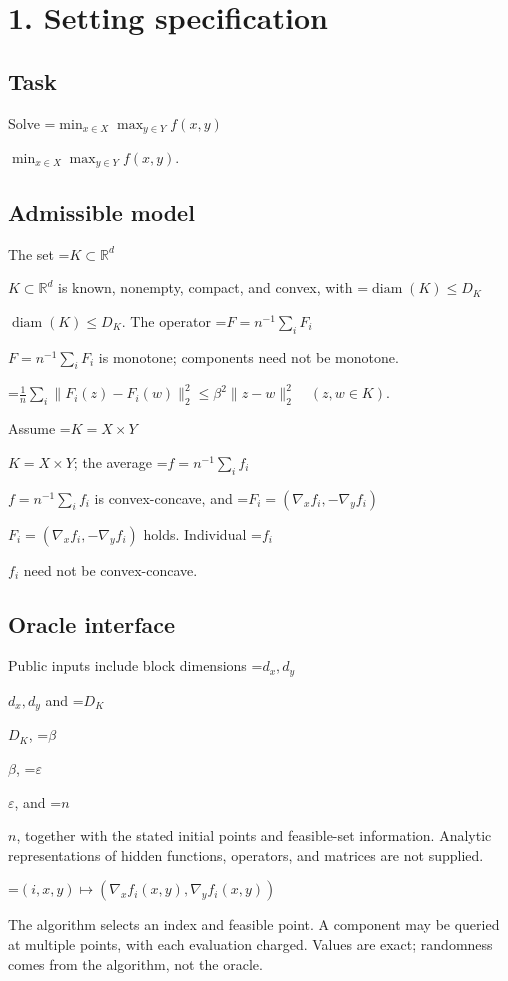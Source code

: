 \documentclass[10pt,a4paper]{article}
\newcommand{\AtlasMath}[1]{\par\begingroup\centering\setbox0=\hbox{$\displaystyle #1$}\ifdim\wd0>1.4\linewidth\typeout{ATLAS WIDE FORMULA: \the\wd0}\fi\ifdim\wd0>\linewidth\resizebox{\linewidth}{!}{\box0}\else\box0\fi\par\endgroup}
\newcommand{\AtlasInlineMath}[1]{\begingroup\setbox0=\hbox{$#1$}\ifdim\wd0>.4\linewidth\endgroup\AtlasMath{#1}\else\endgroup$#1$\fi}
\begin{document}
\section{1. Setting specification}


\subsection{Task}


Solve \AtlasInlineMath{\min_{x\in X}\max_{y\in Y}f(x,y)}.



\subsection{Admissible model}


The set \AtlasInlineMath{K\subset\mathbb{R}^d} is known, nonempty, compact, and convex, with \AtlasInlineMath{\operatorname{diam}(K)\le D_K}. The operator \AtlasInlineMath{F=n^{-1}\sum_iF_i} is monotone; components need not be monotone.




\AtlasMath{\frac1n\sum_i\|F_i(z)-F_i(w)\|_2^2\le\beta^2\|z-w\|_2^2\quad(z,w\in K).}




Assume \AtlasInlineMath{K=X\times Y}; the average \AtlasInlineMath{f=n^{-1}\sum_i f_i} is convex-concave, and \AtlasInlineMath{F_i=(\nabla_xf_i,-\nabla_yf_i)} holds. Individual \AtlasInlineMath{f_i} need not be convex-concave.



\subsection{Oracle interface}


Public inputs include block dimensions \AtlasInlineMath{d_x,d_y} and \AtlasInlineMath{D_K}, \AtlasInlineMath{\beta}, \AtlasInlineMath{\varepsilon}, and \AtlasInlineMath{n}, together with the stated initial points and feasible-set information. Analytic representations of hidden functions, operators, and matrices are not supplied.




\AtlasMath{(i,x,y)\longmapsto(\nabla_xf_i(x,y),\nabla_yf_i(x,y))}




The algorithm selects an index and feasible point. A component may be queried at multiple points, with each evaluation charged. Values are exact; randomness comes from the algorithm, not the oracle.
\end{document}

